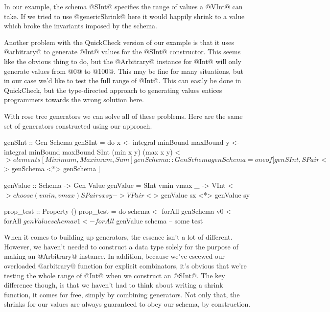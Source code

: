 In our example, the schema @SInt@ specifies the range of values a @VInt@ can take. If we tried to use @genericShrink@ here it would happily shrink to a value which broke the invariants imposed by the schema.

Another problem with the QuickCheck version of our example is that it uses @arbitrary@ to generate @Int@ values for the @SInt@ constructor. This seems like the obvious thing to do, but the @Arbitrary@ instance for @Int@ will only generate values from @0@ to @100@. This may be fine for many situations, but in our case we'd like to test the full range of @Int@. This can easily be done in QuickCheck, but the type-directed approach to generating values entices programmers towards the wrong solution here. 

With rose tree generators we can solve all of these problems. Here are the same set of generators constructed using our approach.

\begin{code}
  genSInt :: Gen Schema
  genSInt = do
    x <- integral minBound maxBound
    y <- integral minBound maxBound
    SInt (min x y) (max x y)
      <$> elements [Minimum, Maximum, Sum]

  genSchema :: Gen Schema
  genSchema =
    oneof [
        genSInt
      , SPair <$> genSchema <*> genSchema
      ]

  genValue :: Schema -> Gen Value
  genValue = \case
    SInt vmin vmax _ ->
      VInt <$> choose (vmin, vmax)
    SPair sx sy ->
      VPair <$> genValue sx <*> genValue sy

  prop_test :: Property ()
  prop_test = do
    schema <- forAll genSchema
    v0 <- forAll $ genValue schema
    v1 <- forAll $ genValue schema
    -- some test
\end{code}

When it comes to building up generators, the essence isn't a lot of different. However, we haven't needed to construct a data type solely for the purpose of making an @Arbitrary@ instance. In addition, because we've escewed our overloaded @arbitrary@ function for explicit combinators, it's obvious that we're testing the whole range of @Int@ when we construct an @SInt@. The key difference though, is that we haven't had to think about writing a shrink function, it comes for free, simply by combining generators. Not only that, the shrinks for our values are always guaranteed to obey our schema, by construction.
